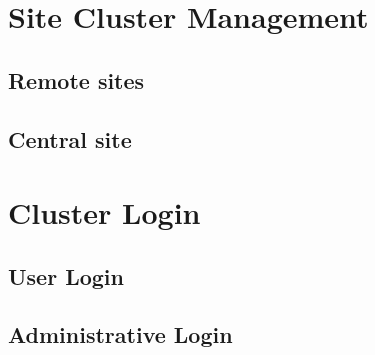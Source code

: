 \documentclass[12pt,a4paper]{article}
\begin{document}
\section{Site Cluster Management}

\subsection{Remote sites}

\subsection{Central site}

\section{Cluster Login}


\subsection{User Login}

\subsection{Administrative Login}


\newpage
{}

\end{document}
